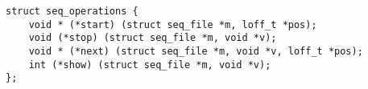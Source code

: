 
\begin{lstlisting}
struct seq_operations {
	void * (*start) (struct seq_file *m, loff_t *pos);
	void (*stop) (struct seq_file *m, void *v);
	void * (*next) (struct seq_file *m, void *v, loff_t *pos);
	int (*show) (struct seq_file *m, void *v);
};
\end{lstlisting}
